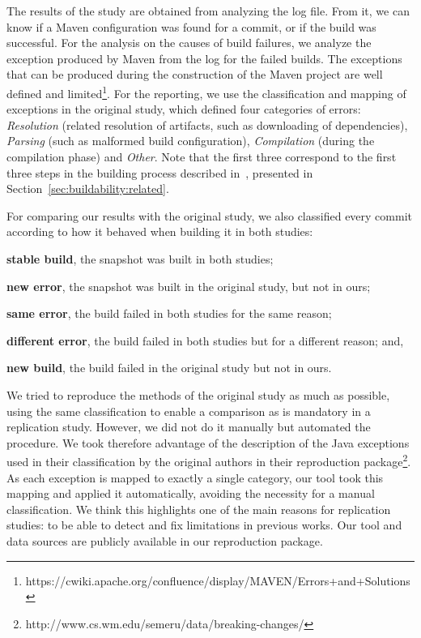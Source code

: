 The results of the study are obtained from analyzing the log file. From it, we can know if a Maven configuration was found for a commit, or if the build was successful. For the analysis on the causes of build failures, we analyze the exception produced by Maven from the log for the failed builds. The exceptions that can be produced during the construction of the Maven project are well defined and limited\footnote{https://cwiki.apache.org/confluence/display/MAVEN/Errors+and+Solutions}. For the reporting, we use the classification and mapping of exceptions in the original study, which defined four categories of errors: \textit{Resolution} (related resolution of artifacts, such as downloading of dependencies), \textit{Parsing} (such as malformed build configuration), \textit{Compilation} (during the compilation phase) and \textit{Other}. Note that the first three correspond to the first three steps in the building process described in~\cite{Sulir:2016:QSJ:3001878.3001882}, presented in Section~\ref{sec:buildability:related}.

For comparing our results with the original study, we also classified every commit according to how it behaved when building it in both studies:
\begin{inparaenum}[\bf(1)]
  \item \textbf{stable build}, the snapshot was built in both studies;
  \item \textbf{new error}, the snapshot was built in the original study, but not in ours;
  \item \textbf{same error}, the build failed in both studies for the same reason;
  \item \textbf{different error}, the build failed in both studies but for a different reason; and,
  \item \textbf{new build}, the build failed in the original study but not in ours.
\end{inparaenum}

We tried to reproduce the methods of the original study as much as possible, using the same classification to enable a comparison as is mandatory in a replication study.
However, we did not do it manually but automated the procedure.
We took therefore advantage of the description of the Java exceptions used in their classification by the original authors in their reproduction package\footnote{http://www.cs.wm.edu/semeru/data/breaking-changes/}.
As each exception is mapped to exactly a single category, our tool took this mapping and applied it automatically, avoiding the necessity for a manual classification.
We think this highlights one of the main reasons for replication studies: to be able to detect and fix limitations in previous works.
Our tool and data sources are publicly available in our reproduction package.


